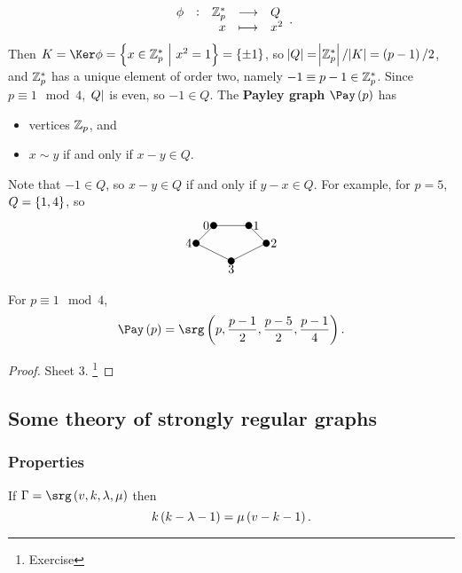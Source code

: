 \begin{example*}
\begin{itemize}
$$ \function[\phi]{\ZZ_p^*}{Q}{x}{x^2}. $$
Then $ K = \Ker \phi = \cbr{x \in \ZZ_p^* \st x^2 = 1} = \cbr{\pm 1} $, so $ \abs{Q} = \abs{\ZZ_p^*} / \abs{K} = \br{p - 1} / 2 $, and $ \mathbb{Z}_p^* $ has a unique element of order two, namely $ -1 \equiv p - 1 \in \mathbb{Z}_p^* $. Since $ p \equiv 1 \mod 4 $, $ \abs{Q} $ is even, so $ -1 \in Q $. The \textbf{Payley graph} $ \Pay\br{p} $ has
\begin{itemize}
\item vertices $ \mathbb{Z}_p $, and
\item $ x \sim y $ if and only if $ x - y \in Q $.
\end{itemize}
Note that $ -1 \in Q $, so $ x - y \in Q $ if and only if $ y - x \in Q $. For example, for $ p = 5 $, $ Q = \cbr{1, 4} $, so
$$
\begin{tikzpicture}
\fill (0, 0) circle (0.1) node[left]{$ 0 $};
\fill (1, 0) circle (0.1) node[right]{$ 1 $};
\fill (-0.5, -0.5) circle (0.1) node[left]{$ 4 $};
\fill (1.5, -0.5) circle (0.1) node[right]{$ 2 $};
\fill (0.5, -1) circle (0.1) node[below]{$ 3 $};
\draw (0, 0) to (1, 0);
\draw (0, 0) to (-0.5, -0.5);
\draw (1, 0) to (1.5, -0.5);
\draw (-0.5, -0.5) to (0.5, -1);
\draw (1.5, -0.5) to (0.5, -1);
\end{tikzpicture}
$$
\end{itemize}
\end{example*}

\begin{proposition}
For $ p \equiv 1 \mod 4 $,
$$ \Pay\br{p} = \srg\br{p, \dfrac{p - 1}{2}, \dfrac{p - 5}{2}, \dfrac{p - 1}{4}}. $$
\end{proposition}

\begin{proof}
Sheet $ 3 $. \footnote{Exercise}
\end{proof}

\pagebreak

\subsection{Some theory of strongly regular graphs}

\subsubsection{Properties}

\begin{proposition}
\label{prop:2.5}
If $ \Gamma = \srg\br{v, k, \lambda, \mu} $ then
$$ k\br{k - \lambda - 1} = \mu\br{v - k - 1}. $$
\end{proposition}

